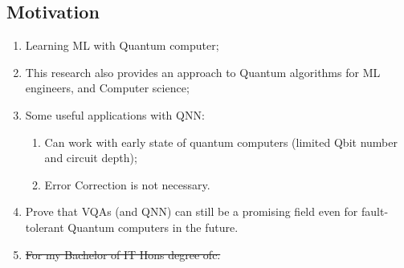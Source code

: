 \subsection{Motivation}
\begin{enumerate}
    \item Learning ML with Quantum computer;
    \item This research also provides an approach to Quantum algorithms for ML engineers, and Computer science;
    \item Some useful applications with QNN:
    \begin{enumerate}
        \item Can work with early state of quantum computers (limited Qbit number and circuit depth);
        \item Error Correction is not necessary.
    \end{enumerate}
    \item Prove that VQAs (and QNN) can still be a promising field even for fault-tolerant Quantum computers in the future.
    \item \st{For my Bachelor of IT Hons degree ofc.}
\end{enumerate}
